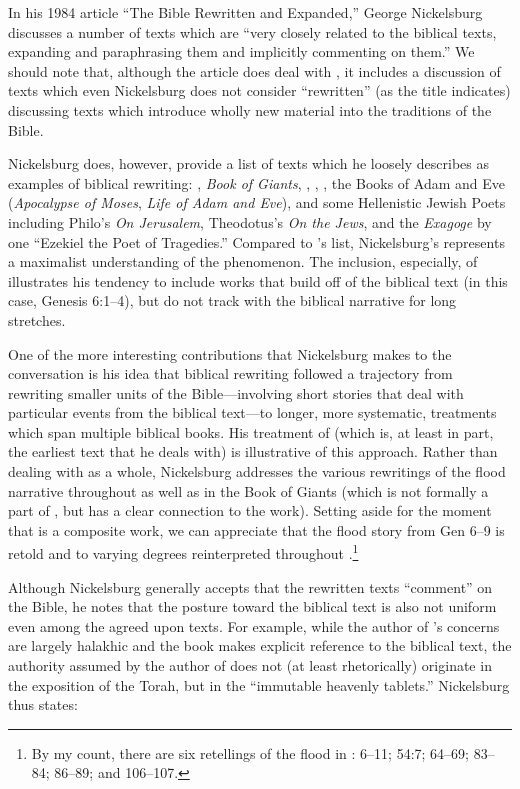 In his 1984 article ``The Bible Rewritten and Expanded,'' George Nickelsburg discusses a number of texts which are ``very closely related to the biblical texts, expanding and paraphrasing them and implicitly commenting on them.''%
    \autocite[89]{nickelsburg_stone1984}
We should note that, although the article does deal with \rwb, it includes a discussion of texts which even Nickelsburg does not consider ``rewritten'' (as the title indicates) discussing texts which introduce wholly new material into the traditions of the Bible.%
    \autocite[89--90]{nickelsburg_stone1984}

Nickelsburg does, however, provide a list of texts which he loosely describes as examples of biblical rewriting: \firstenoch, \emph{Book of Giants}, \jub, \ga, \ant, the Books of Adam and Eve (\emph{Apocalypse of Moses}, \emph{Life of Adam and Eve}), and some Hellenistic Jewish Poets including Philo's \emph{On Jerusalem}, Theodotus's \emph{On the Jews}, and the \emph{Exagoge} by one ``Ezekiel the Poet of Tragedies.'' Compared to \vermes's list, Nickelsburg's represents a maximalist understanding of the \rwb phenomenon. The inclusion, especially, of \firstenoch illustrates his tendency to include works that build off of the biblical text (in this case, Genesis 6:1--4), but do not track with the biblical narrative for long stretches. 

One of the more interesting contributions that Nickelsburg makes to the conversation is his idea that biblical rewriting followed a trajectory from rewriting smaller units of the Bible---involving short stories that deal with particular events from the biblical text---to longer, more systematic, treatments which span multiple biblical books. His treatment of \firstenoch (which is, at least in part, the earliest text that he deals with) is illustrative of this approach. Rather than dealing with \firstenoch as a whole, Nickelsburg addresses the various rewritings of the flood narrative throughout \firstenoch as well as in the Book of Giants (which is not formally a part of \firstenoch, but has a clear connection to the work).%
    \autocite[90--97]{nickelsburg_stone1984}
Setting aside for the moment that \firstenoch is a composite work, we can appreciate that the flood story from Gen 6--9 is retold and to varying degrees reinterpreted throughout \firstenoch.\footnote{By my count, there   are six retellings of the flood in \firstenoch: 6--11; 54:7; 64--69;   83--84; 86--89; and 106--107.} 

Although Nickelsburg generally accepts that the rewritten texts ``comment'' on the Bible, he notes that the posture toward the biblical text is also not uniform even among the agreed upon \rwb texts. For example, while the author of \jub's concerns are largely halakhic and the book makes explicit reference to the biblical text, the authority assumed by the author of \jub does not (at least rhetorically) originate in the exposition of the Torah, but in the ``immutable heavenly tablets.''%
    \autocite[100--101]{nickelsburg_stone1984}
Nickelsburg thus states: 

